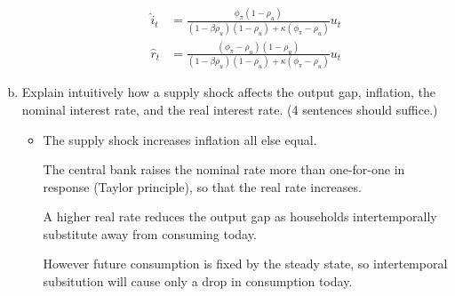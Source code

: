 \documentclass{article}
\newcommand{\1}{\mathbf{1}}
\begin{document}
\begin{enumerate}[(a)]
\begin{itemize}
\begin{align*}
	\hat{i}_t&= \frac{\phi_\pi(1-\rho_u)}{(1-\beta\rho_u)(1-\rho_u) +\kappa(\phi_\pi-\rho_u)}u_t \\
	\hat{r}_{t}&= \frac{(\phi_\pi-\rho_u)(1-\rho_u)}{(1-\beta\rho_u)(1-\rho_u) +\kappa(\phi_\pi-\rho_u)}u_t
\end{align*}
\end{itemize}
\item Explain intuitively how a supply shock affects the output gap, inflation, the nominal interest rate, and the real interest rate. (4 sentences should suffice.)
\begin{itemize}
	\item The supply shock increases inflation all else equal. 
	
	The central bank raises the nominal rate more than one-for-one in response (Taylor principle), so that the real rate increases. 
	
	A higher real rate reduces the output gap as households intertemporally substitute away from consuming today.
	
	However future consumption is fixed by the steady state, so intertemporal subsitution will cause only a drop in consumption today.


\end{itemize}
\end{enumerate}
\end{document}
